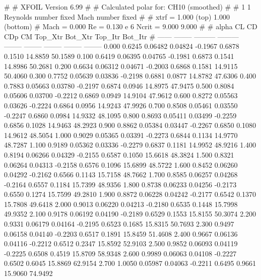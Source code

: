#  
#       XFOIL         Version 6.99
#  
# Calculated polar for: CH10 (smoothed)                                 
#  
# 1 1 Reynolds number fixed          Mach number fixed         
#  
# xtrf =   1.000 (top)        1.000 (bottom)  
# Mach =   0.000     Re =     0.130 e 6     Ncrit =   9.000  9.000
#  
#   alpha    CL        CD       CDp       CM     Top_Xtr  Bot_Xtr  Top_Itr  Bot_Itr
#  ------ -------- --------- --------- -------- -------- -------- -------- --------
   0.000   0.6245   0.06482   0.04824  -0.1967   0.6878   0.1510  14.8859  50.1589
   0.100   0.6419   0.06395   0.04765  -0.1981   0.6873   0.1541  14.8986  50.2681
   0.200   0.6634   0.06312   0.04671  -0.2003   0.6868   0.1581  14.9115  50.4060
   0.300   0.7752   0.05639   0.03836  -0.2198   0.6881   0.0877  14.8782  47.6306
   0.400   0.7883   0.05663   0.03780  -0.2197   0.6874   0.0946  14.8975  47.9475
   0.500   0.8084   0.05606   0.03700  -0.2212   0.6869   0.0949  14.9104  47.9612
   0.600   0.8272   0.05563   0.03626  -0.2224   0.6864   0.0956  14.9243  47.9926
   0.700   0.8508   0.05461   0.03550  -0.2247   0.6860   0.0984  14.9332  48.1095
   0.800   0.8693   0.05411   0.03499  -0.2259   0.6856   0.1028  14.9463  48.2923
   0.900   0.8862   0.05384   0.03447  -0.2267   0.6850   0.1080  14.9612  48.5054
   1.000   0.9029   0.05365   0.03391  -0.2273   0.6844   0.1134  14.9770  48.7287
   1.100   0.9189   0.05362   0.03336  -0.2279   0.6837   0.1181  14.9952  48.9216
   1.400   0.8194   0.06266   0.04329  -0.2155   0.6587   0.1050  15.6618  48.3824
   1.500   0.8321   0.06264   0.04313  -0.2158   0.6576   0.1096  15.6899  48.5722
   1.600   0.8452   0.06260   0.04292  -0.2162   0.6566   0.1143  15.7158  48.7662
   1.700   0.8585   0.06257   0.04268  -0.2164   0.6557   0.1184  15.7399  48.9356
   1.800   0.8738   0.06233   0.04256  -0.2173   0.6550   0.1274  15.7599  49.2810
   1.900   0.8872   0.06228   0.04242  -0.2177   0.6542   0.1370  15.7808  49.6418
   2.000   0.9013   0.06220   0.04213  -0.2180   0.6535   0.1448  15.7998  49.9352
   2.100   0.9178   0.06192   0.04190  -0.2189   0.6529   0.1553  15.8155  50.3074
   2.200   0.9331   0.06179   0.04164  -0.2195   0.6523   0.1685  15.8315  50.7693
   2.300   0.9497   0.06158   0.04140  -0.2203   0.6517   0.1891  15.8459  51.4608
   2.400   0.9667   0.06136   0.04116  -0.2212   0.6512   0.2347  15.8592  52.9103
   2.500   0.9852   0.06093   0.04119  -0.2225   0.6508   0.4519  15.8709  58.9348
   2.600   0.9989   0.06063   0.04108  -0.2227   0.6502   0.6045  15.8869  62.9154
   2.700   1.0050   0.05987   0.04063  -0.2211   0.6495   0.9661  15.9060  74.9492
